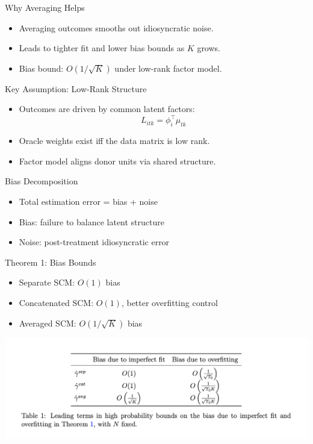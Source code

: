 \documentclass{beamer}
\begin{document}
\begin{frame}{Why Averaging Helps}
  \begin{itemize}
    \item Averaging outcomes smooths out idiosyncratic noise.
    \item Leads to tighter fit and lower bias bounds as $K$ grows.
    \item Bias bound: $O(1/\sqrt{K})$ under low-rank factor model.
  \end{itemize}
\end{frame}

\begin{frame}{Key Assumption: Low-Rank Structure}
  \begin{itemize}
    \item Outcomes are driven by common latent factors:
    \[ L_{itk} = \phi_i^\top \mu_{tk} \]
    \item Oracle weights exist iff the data matrix is low rank.
    \item Factor model aligns donor units via shared structure.
  \end{itemize}
\end{frame}

\begin{frame}{Bias Decomposition}
  \begin{itemize}
    \item Total estimation error = bias + noise
    \item Bias: failure to balance latent structure
    \item Noise: post-treatment idiosyncratic error
  \end{itemize}
\end{frame}

\begin{frame}{Theorem 1: Bias Bounds}
  \begin{itemize}
    \item Separate SCM: $O(1)$ bias
    \item Concatenated SCM: $O(1)$, better overfitting control
    \item Averaged SCM: $O(1/\sqrt{K})$ bias
  \end{itemize}
  \includegraphics[width=0.9\linewidth]{./lecture_includes/table1_bounds.png}
\end{frame}
\end{document}
